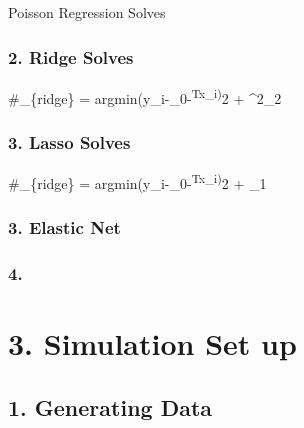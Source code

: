 \documentclass[
]{article}
\begin{document}
Poisson Regression Solves

\hypertarget{ridge-solves}{%
\subsubsection{2. Ridge Solves}\label{ridge-solves}}

\#\hat{\beta}\_\{ridge\} =
argmin\sum(y\_i-\beta\_0-\beta\textsuperscript{Tx\_i)}2 +
 \textbar\textbar{}\beta\textbar\textbar\^{}2\_2

\hypertarget{lasso-solves}{%
\subsubsection{3. Lasso Solves}\label{lasso-solves}}

\#\hat{\beta}\_\{ridge\} =
argmin\sum(y\_i-\beta\_0-\beta\textsuperscript{Tx\_i)}2 +
 \textbar\textbar{}\beta\textbar\textbar\_1

\hypertarget{elastic-net}{%
\subsubsection{3. Elastic Net}\label{elastic-net}}

\hypertarget{section}{%
\subsubsection{4.}\label{section}}

\hypertarget{simulation-set-up}{%
\section{3. Simulation Set up}\label{simulation-set-up}}

\hypertarget{generating-data}{%
\subsection{1. Generating Data}\label{generating-data}}
\end{document}
